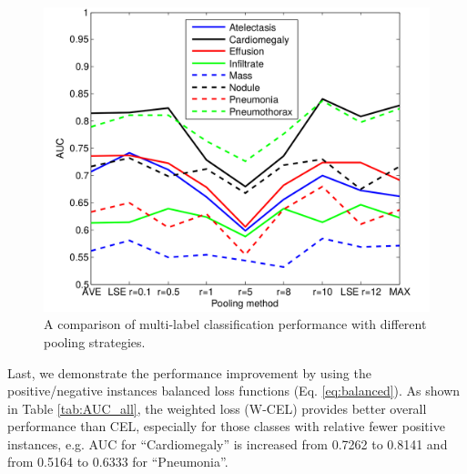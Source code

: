 \documentclass[10pt,twocolumn,letterpaper]{article}
\begin{document}
\begin{figure}[h]
\centering
	\includegraphics[width=0.80\columnwidth]{pooling.png}
	\caption{A comparison of multi-label classification performance with different pooling strategies.}
	\label{fig:AUC_pool}
\end{figure}

Last, we demonstrate the performance improvement by using the positive/negative instances balanced loss functions (Eq. \ref{eq:balanced}). As shown in Table \ref{tab:AUC_all}, the weighted loss (W-CEL) provides better overall performance than CEL, especially for those classes with relative fewer positive instances, e.g. AUC for ``Cardiomegaly'' is increased from 0.7262 to 0.8141 and from 0.5164 to 0.6333 for ``Pneumonia''.

\end{document}
